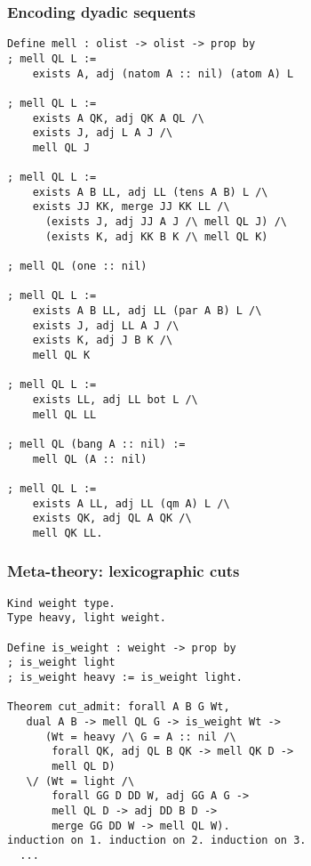 \documentclass{beamer}
\begin{document}
\begin{frame}[fragile]
  \frametitle{Encoding dyadic sequents}

  \mbox{}\bigskip

\begin{lstlisting}
Define mell : olist -> olist -> prop by
; mell QL L :=
    exists A, adj (natom A :: nil) (atom A) L

; mell QL L :=
    exists A QK, adj QK A QL /\
    exists J, adj L A J /\
    mell QL J

; mell QL L :=
    exists A B LL, adj LL (tens A B) L /\
    exists JJ KK, merge JJ KK LL /\
      (exists J, adj JJ A J /\ mell QL J) /\
      (exists K, adj KK B K /\ mell QL K)

; mell QL (one :: nil)

; mell QL L :=
    exists A B LL, adj LL (par A B) L /\
    exists J, adj LL A J /\
    exists K, adj J B K /\
    mell QL K

; mell QL L :=
    exists LL, adj LL bot L /\
    mell QL LL

; mell QL (bang A :: nil) :=
    mell QL (A :: nil)

; mell QL L :=
    exists A LL, adj LL (qm A) L /\
    exists QK, adj QL A QK /\
    mell QK LL.
\end{lstlisting}
\end{frame}

\begin{frame}[fragile]
  \frametitle{Meta-theory: lexicographic cuts}

\begin{lstlisting}
Kind weight type.
Type heavy, light weight.

Define is_weight : weight -> prop by
; is_weight light
; is_weight heavy := is_weight light.

Theorem cut_admit: forall A B G Wt,
   dual A B -> mell QL G -> is_weight Wt ->
      (Wt = heavy /\ G = A :: nil /\
       forall QK, adj QL B QK -> mell QK D ->
       mell QL D)
   \/ (Wt = light /\
       forall GG D DD W, adj GG A G ->
       mell QL D -> adj DD B D ->
       merge GG DD W -> mell QL W).
induction on 1. induction on 2. induction on 3.
  ...
\end{lstlisting}
\end{frame}
\end{document}

